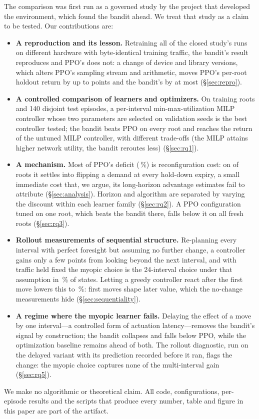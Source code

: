 The comparison was first run as a governed study by the project that
developed the environment, which found the bandit ahead. We treat that study
as a claim to be tested. Our contributions are:

\begin{itemize}
\item \textbf{A reproduction and its lesson.} Retraining all of the closed
study's runs on different hardware with byte-identical training traffic, the
bandit's result reproduces and PPO's does not: a change of device and library
versions, which alters PPO's sampling stream and arithmetic, moves PPO's
per-root holdout return by up to \ReproMaxShiftPPO{} points and the bandit's
by at most \ReproMaxShiftBandit{} (\S\ref{sec:repro}).
\item \textbf{A controlled comparison of learners and optimizers.} On
\TestBanditRoots{} training roots and 140 disjoint test episodes, a
per-interval min-max-utilization MILP controller whose two parameters are
selected on validation seeds is the best controller tested; the bandit beats
PPO on every root and reaches the return of the untuned MILP controller, with
different trade-offs (the MILP attains higher network utility, the bandit
reroutes less) (\S\ref{sec:rq1}).
\item \textbf{A mechanism.} Most of PPO's deficit
(\GapCostSharePct\,\%) is reconfiguration cost: on \PPOFlappingRoots{} of
\TestPPORoots{} roots it settles into flipping a demand at every hold-down
expiry, a small immediate cost that, we argue, its long-horizon advantage
estimates fail to attribute (\S\ref{sec:analysis}). Horizon and algorithm
are separated by varying the discount within each learner family
(\S\ref{sec:rq2}). A PPO configuration tuned on one root, which beats the
bandit there, falls below it on all \RQThreeTunedVsBanditRoots{} fresh roots
(\S\ref{sec:rq3}).
\item \textbf{Rollout measurements of sequential structure.} Re-planning
every interval with perfect foresight but assuming no further change, a
controller gains only a few points from looking beyond the next interval, and
with traffic held fixed the myopic choice is the 24-interval choice under that
assumption in \SeqFrozenAgreeHTwentyFour\,\% of states. Letting a greedy
controller react after the first move lowers this to
\SeqContFrozenAgreeHTwentyFour\,\%: first moves shape later value, which the
no-change measurements hide (\S\ref{sec:sequentiality}).
\item \textbf{A regime where the myopic learner fails.} Delaying the effect of
a move by one interval---a controlled form of actuation latency---removes the
bandit's signal by construction; the bandit collapses and falls below PPO,
while the optimization baseline remains ahead of both. The rollout diagnostic,
run on the delayed variant with its prediction recorded before it ran, flags
the change: the
myopic choice captures none of the multi-interval gain (\S\ref{sec:rq5}).
\end{itemize}

We make no algorithmic or theoretical claim. All code, configurations,
per-episode results and the scripts that produce every number, table and
figure in this paper are part of the artifact.

